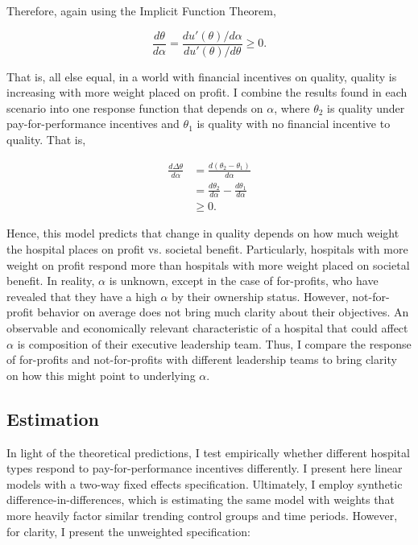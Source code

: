 \documentclass[12pt]{article}
\begin{document}
    Therefore, again using the Implicit Function Theorem,

    $$\frac{d\theta}{d\alpha} = \frac{du'(\theta)/d\alpha}{du'(\theta)/d\theta}\geq0.$$

    That is, all else equal, in a world with financial incentives on quality, quality is increasing with more weight placed on profit. I combine the results found in each scenario into one response function that depends on $\alpha$, where $\theta_2$ is quality under pay-for-performance incentives and $\theta_1$ is quality with no financial incentive to quality. That is, 

    \begin{align*}
        \frac{d\Delta\theta}{d\alpha}&=\frac{d(\theta_2-\theta_1)}{d\alpha}\\
        &=\frac{d\theta_2}{d\alpha}-\frac{d\theta_1}{d\alpha}\\
        &\geq 0.
    \end{align*}


    Hence, this model predicts that change in quality depends on how much weight the hospital places on profit vs. societal benefit. Particularly, hospitals with more weight on profit respond more than hospitals with more weight placed on societal benefit. In reality, $\alpha$ is unknown, except in the case of for-profits, who have revealed that they have a high $\alpha$ by their ownership status. However, not-for-profit behavior on average does not bring much clarity about their objectives. An observable and economically relevant characteristic of a hospital that could affect $\alpha$ is composition of their executive leadership team. Thus, I compare the response of for-profits and not-for-profits with different leadership teams to bring clarity on how this might point to underlying $\alpha$.
    

    \subsection{Estimation}

    In light of the theoretical predictions, I test empirically whether different hospital types respond to pay-for-performance incentives differently. I present here linear models with a two-way fixed effects specification. Ultimately, I employ synthetic difference-in-differences, which is estimating the same model with weights that more heavily factor similar trending control groups and time periods. However, for clarity, I present the unweighted specification:
\end{document}
